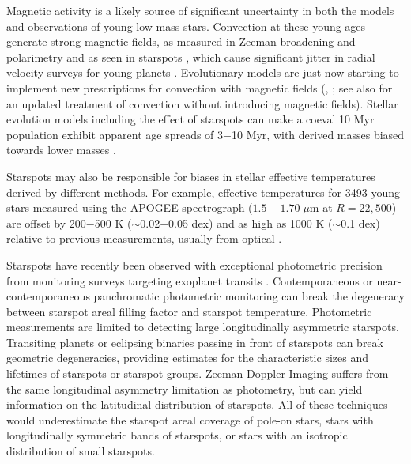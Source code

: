 \documentclass[twocolumn]{emulateapj}%
\begin{document}
Magnetic activity is a likely source of significant uncertainty in both the models and observations of young low-mass stars. Convection at these young ages generate strong magnetic fields, as measured in Zeeman broadening and polarimetry \citep[e.g.][]{johnskrull07,donati09} and as seen in starspots \citep[e.g.][]{stauffer03,grankin08}, which cause significant jitter in radial velocity surveys for young planets \citep[e.g.][]{donati14}.  Evolutionary models are just now starting to implement new prescriptions for convection with magnetic fields (\citet{somers15}, \citet{feiden16}; see also \citet{baraffe15} for an updated treatment of convection without introducing magnetic fields).  Stellar evolution models including the effect of starspots can make a coeval 10 Myr population exhibit apparent age spreads of 3$-$10 Myr, with derived masses biased towards lower masses \citep{somers15}.  

Starspots may also be responsible for biases in stellar effective temperatures derived by different methods.  For example, effective temperatures for 3493 young stars measured using the APOGEE spectrograph ($1.5-1.70 \;\mu$m at $R=22,500$) are offset by 200$-$500 K ($\sim$0.02$-$0.05 dex) and as high as 1000 K ($\sim$0.1 dex) relative to previous measurements, usually from optical \citep{cottaar14}.  



Starspots have recently been observed with exceptional photometric precision from monitoring surveys targeting exoplanet transits \citep{harrison11,davenport15}.  Contemporaneous or near-contemporaneous panchromatic photometric monitoring \citep{bouvier95,grankin07} can break the degeneracy between starspot areal filling factor and starspot temperature. Photometric measurements are limited to detecting large longitudinally asymmetric starspots.  Transiting planets or eclipsing binaries passing in front of starspots \citep{desert11} can break geometric degeneracies, providing estimates for the characteristic sizes and lifetimes of starspots or starspot groups.  Zeeman Doppler Imaging \citep[ZDI]{donati14} suffers from the same longitudinal asymmetry limitation as photometry, but can yield information on the latitudinal distribution of starspots.  All of these techniques would underestimate the starspot areal coverage of pole-on stars, stars with longitudinally symmetric bands of starspots, or stars with an isotropic distribution of small starspots.  
\end{document}
